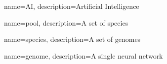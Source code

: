 
{
    name=AI,
    description={Artificial Intelligence}
}

{
    name=pool,
    description={A set of species}
}

{
    name=species,
    description={A set of genomes}
}

{
    name=genome,
    description={A single neural network}
}

\glsaddall
\clearpage
\printglossary[title=Special Terms, toctitle=List of terms]
